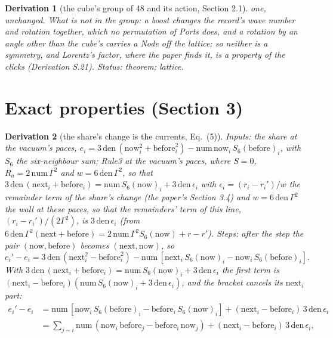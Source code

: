 \documentclass[pdflatex,sn-mathphys-num]{sn-jnl}
\newcommand{\num}{\mathrm{num}}
\newcommand{\den}{\mathrm{den}}
\theoremstyle{thmstyleone}
\newtheorem{derivation}{Derivation}
\begin{document}
\begin{derivation}[the cube's group of 48 and its action, Section 2.1]
one, unchanged. \emph{What is not in the group:} a boost changes the record's wave number and rotation together, which no permutation of Ports does, and a rotation by an angle other than the cube's carries a Node off the lattice; so neither is a symmetry, and Lorentz's factor, where the paper finds it, is a property of the clicks (Derivation S.21).
 \emph{Status:} theorem; lattice.
\end{derivation}

\section*{Exact properties (Section 3)}

\begin{derivation}[the share's change is the currents, Eq.~(5)]
\emph{Inputs:} the share at the vacuum's paces, $e_i = 3\,\den\,(\mathrm{now}_i^2 + \mathrm{before}_i^2) - \num\,\mathrm{now}_i\,S_6(\mathrm{before})_i$, with $S_6$ the six-neighbour sum; Rule3 at the vacuum's paces, where $S = 0$, $R_a = 2\,\num\,\Gamma^2$ and $w = 6\,\den\,\Gamma^2$, so that $3\,\den\,(\mathrm{next}_i + \mathrm{before}_i) = \num\,S_6(\mathrm{now})_i + 3\,\den\,\epsilon_i$ with $\epsilon_i = (r_i - r_i') / w$ the remainder term of the share's change (the paper's Section 3.4) and $w = 6\,\den\,\Gamma^2$ the wall at these paces, so that the remainders' term of this line, $(r_i - r_i') / (2\Gamma^2)$, is $3\,\den\,\epsilon_i$ (from $6\,\den\,\Gamma^2(\mathrm{next} + \mathrm{before}) = 2\,\num\,\Gamma^2 S_6(\mathrm{now}) + r - r'$). \emph{Steps:} after the step the pair $(\mathrm{now}, \mathrm{before})$ becomes $(\mathrm{next}, \mathrm{now})$, so
\[
e_i' - e_i = 3\,\den\,(\mathrm{next}_i^2 - \mathrm{before}_i^2) - \num\,[\mathrm{next}_i\,S_6(\mathrm{now})_i - \mathrm{now}_i\,S_6(\mathrm{before})_i].
\]
With $3\,\den\,(\mathrm{next}_i + \mathrm{before}_i) = \num\,S_6(\mathrm{now})_i + 3\,\den\,\epsilon_i$ the first term is $(\mathrm{next}_i - \mathrm{before}_i)(\num\,S_6(\mathrm{now})_i + 3\,\den\,\epsilon_i)$, and the bracket cancels its $\mathrm{next}_i$ part:
\begin{align*}
e_i' - e_i &= \num\,[\mathrm{now}_i\,S_6(\mathrm{before})_i - \mathrm{before}_i\,S_6(\mathrm{now})_i] + (\mathrm{next}_i - \mathrm{before}_i)\,3\,\den\,\epsilon_i\\
&= \sum_{j \sim i} \num\,(\mathrm{now}_i\,\mathrm{before}_j - \mathrm{before}_i\,\mathrm{now}_j) + (\mathrm{next}_i - \mathrm{before}_i)\,3\,\den\,\epsilon_i,
\end{align*}

\end{derivation}
\end{document}

